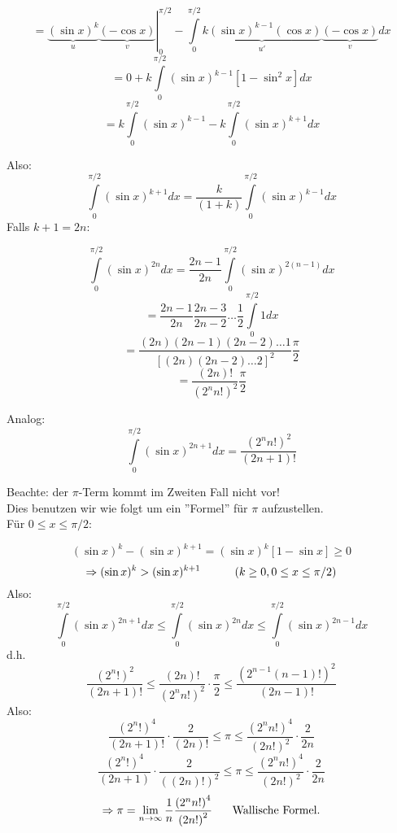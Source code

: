 $$ = \left. {\underbrace {{{(\sin x)}^k}}_u\underbrace {( - \cos x)}_v} \right|_0^{\pi /2} - \int\limits_0^{\pi /2} {\underbrace {k{{(\sin x)}^{k - 1}}(\cos x)}_{u'}} \underbrace {( - \cos x)}_vdx$$
$$ = 0 + k\int\limits_0^{\pi /2} {{{(\sin x)}^{k - 1}}} \left[ {1 - {{\sin }^2}x} \right]dx$$
$$ = k\int\limits_0^{\pi /2} {{{(\sin x)}^{k - 1}} - k\int\limits_0^{\pi /2} {{{(\sin x)}^{k + 1}}dx} } $$


Also:
\[\int\limits_0^{\pi /2} {{{(\sin x)}^{k + 1}}dx = \frac{k}{{(1 + k)}}\int\limits_0^{\pi /2} {{{(\sin x)}^{k - 1}}dx} } \]
Falls $k+1=2n$:

$$\int\limits_0^{\pi /2} {{{(\sin x)}^{2n}}dx = \frac{{2n - 1}}{{2n}}\int\limits_0^{\pi /2} {{{(\sin x)}^{2(n - 1)}}dx} } $$
$$ = \frac{{2n - 1}}{{2n}}\frac{{2n - 3}}{{2n - 2}} \ldots \frac{1}{2}\int\limits_0^{\pi /2} {1dx} $$
$$ = \frac{{(2n)(2n - 1)(2n - 2) \ldots 1}}{{{{\left[ {(2n)(2n - 2) \ldots 2} \right]}^2}}}\frac{\pi }{2}$$
$$ = \frac{{(2n)!}}{{{{({2^n}n!)}^2}}}\frac{\pi }{2}$$

Analog:
\[\int\limits_0^{\pi /2} {{{(\sin x)}^{2n + 1}}dx = \frac{{{{({2^n}n!)}^2}}}{{(2n + 1)!}}} \]

Beachte: der $\pi$-Term kommt im Zweiten Fall nicht vor!\\

Dies benutzen wir wie folgt um ein ''Formel'' für $\pi$ aufzustellen.\\

Für $0\leq x \leq\pi/2$:

\[{(\sin x)^k} - {(\sin x)^{k + 1}} = {(\sin x)^k}\left[ {1 - \sin x} \right] \ge 0\]
\[ \Rightarrow {(\sin x)^k} > {(\sin x)^{k + 1}}\text{\hspace{10mm}} \left( k\geq 0,0\leq x \leq \pi/2\right)\]
Also:
\[\int\limits_0^{\pi /2} {{{(\sin x)}^{2n + 1}}dx \le \int\limits_0^{\pi /2} {{{(\sin x)}^{2n}}dx \le \int\limits_0^{\pi /2} {{{(\sin x)}^{2n - 1}}dx} } } \]
d.h.
\[\frac{{{{({2^n}!)}^2}}}{{(2n + 1)!}} \le \frac{{(2n)!}}{{{{({2^n}n!)}^2}}} \cdot \frac{\pi }{2} \le \frac{{{{\left( {{2^{n - 1}}(n - 1)!} \right)}^2}}}{{(2n - 1)!}}\]
Also:
\[\frac{{{{({2^n}!)}^4}}}{{(2n + 1)!}} \cdot \frac{2}{{(2n)!}} \le \pi  \le \frac{{{{({2^n}n!)}^4}}}{{{{(2n!)}^2}}} \cdot \frac{2}{{2n}}\]
\[\frac{{{{({2^n}!)}^4}}}{{(2n + 1)}} \cdot \frac{2}{{{{((2n)!)}^2}}} \le \pi  \le \frac{{{{({2^n}n!)}^4}}}{{{{(2n!)}^2}}} \cdot \frac{2}{{2n}}\]
\[ \Rightarrow \pi  = \mathop {\lim }\limits_{n \to \infty } \frac{1}{n}\frac{{{{({2^n}n!)}^4}}}{{{{(2n!)}^2}}}\text{\hspace{5mm} Wallische Formel.}\]

